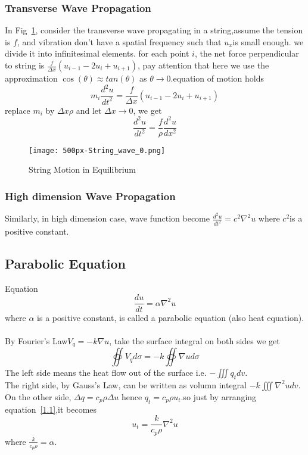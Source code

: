 \documentclass[a4paper]{article}
\begin{document}
\subsubsection{Transverse Wave Propagation}
In Fig~\ref{TWP}, consider the transverse wave propagating in a string,assume the
tension is $f$, and vibration don't have a spatial frequency such
that $u_{x}$is small enough. we divide it into infinitesimal elements.
for each point $i$, the net force perpendicular to string is $\frac{f}{\Delta x}(u_{i-1}-2u_{i}+u_{i+1})$,
pay attention that here we use the approximation $\cos\left(\theta\right)\approx tan(\theta)$
as $\theta\rightarrow0$.equation of motion holds
\[m_{i}\frac{d^{2}u}{dt^{2}}=\frac{f}{\Delta x}(u_{i-1}-2u_{i}+u_{i+1})\]
replace $m_{i}$ by $\Delta x\rho$ and let $\Delta x\rightarrow0$, we get 
\begin{equation}
\frac{d^{2}u}{dt^{2}}=\frac{f}{\rho}\frac{d^{2}u}{dx^{2}}
\end{equation}



\begin{figure}[!htb]
\centering
\texttt{[image: 500px-String\_wave\_0.png]}
\caption{String Motion in Equilibrium}
\label{TWP}
\end{figure}
\subsubsection{High dimension Wave  Propagation}
Similarly, in high dimension case, wave function become $\frac{d^{2}u}{dt^{2}}=c^{2}\nabla^{2}u$
where $c^{2}$is a positive constant.

\subsection{Parabolic Equation}

Equation 
\begin{equation}
\frac{du}{dt}=\alpha\nabla^{2}u
\end{equation} 
where $\alpha$ is a positive constant, is called a parabolic equation (also heat equation).
\\\\
By Fourier's Law$V_{q}=-k\nabla u$, take the surface integral on
both sides we get 
\begin{equation}
\oiint V_{q}d\sigma=-k\oiint\nabla ud\sigma
\label{1.1}
\end{equation}
The left side means the heat flow out of the surface i.e. $-\iiint q_{t}dv$.
\\The right side, by Gauss's Law, can be written as volumn integral
$-k\iiint\nabla^{2}udv$. On the other side, $\Delta q=c_{p}\rho\Delta u$
hence $q_{t}=c_{p}\rho u_{t}$.so just by arranging equation~\ref{1.1},it becomes
\begin{equation}
u_{t}=\frac{k}{c_{p}\rho}\nabla^{2}u
\end{equation} 
where $\frac{k}{c_{p}\rho}=\alpha$.
\end{document}

